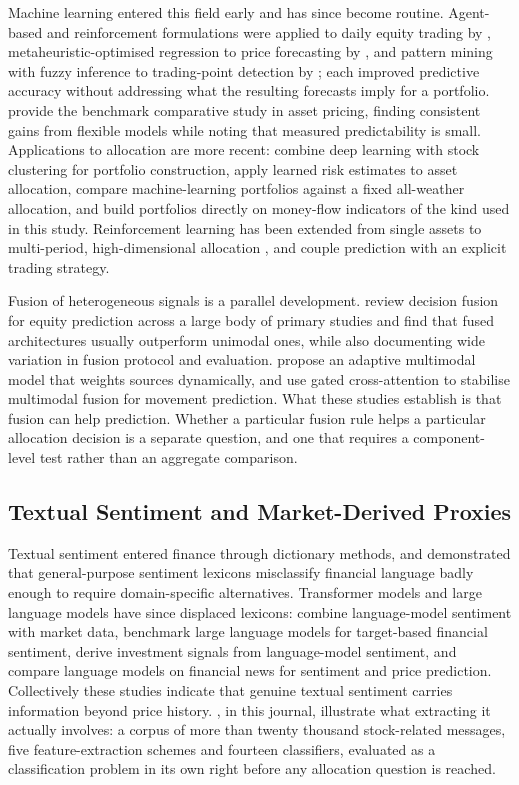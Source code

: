 \documentclass{singlecol-new}
\theoremstyle{TH}{
\newtheorem{lemma}{Lemma}
\newtheorem{theorem}[lemma]{Theorem}
\newtheorem{corrolary}[lemma]{Corrolary}
\newtheorem{conjecture}[lemma]{Conjecture}
\newtheorem{proposition}[lemma]{Proposition}
\newtheorem{claim}[lemma]{Claim}
\newtheorem{stheorem}[lemma]{Wrong Theorem}
\newtheorem{algorithm}{Algorithm}
}
\theoremstyle{THrm}{
\newtheorem{definition}{Definition}[section]
\newtheorem{question}{Question}[section]
\newtheorem{remark}{Remark}
\newtheorem{scheme}{Scheme}
}
\theoremstyle{THhit}{
\newtheorem{case}{Case}[section]
}
\begin{document}
Machine learning entered this field early and has since become routine. Agent-based
and reinforcement formulations were applied to daily equity trading by \citet{lee07},
metaheuristic-optimised regression to price forecasting by \citet{chou18}, and pattern
mining with fuzzy inference to trading-point detection by \citet{huang20}; each
improved predictive accuracy without addressing what the resulting forecasts imply for a
portfolio. \citet{gu20} provide the benchmark comparative study in asset pricing,
finding consistent gains from flexible models while noting that measured predictability
is small. Applications to allocation
are more recent: \citet{ashrafzadeh25} combine deep learning with stock clustering for
portfolio construction, \citet{agal25} apply learned risk estimates to asset
allocation, \citet{ha26} compare machine-learning portfolios against a fixed
all-weather allocation, and \citet{singsiri26} build portfolios directly on money-flow
indicators of the kind used in this study. Reinforcement learning has been extended from single assets to
multi-period, high-dimensional allocation \citep{jiang25, saijai26}, and
\citet{wang26} couple prediction with an explicit trading strategy.

Fusion of heterogeneous signals is a parallel development. \citet{zhang22} review
decision fusion for equity prediction across a large body of primary studies and find
that fused architectures usually outperform unimodal ones, while also documenting wide
variation in fusion protocol and evaluation. \citet{farimani24} propose an adaptive
multimodal model that weights sources dynamically, and \citet{zong25} use gated
cross-attention to stabilise multimodal fusion for movement prediction. What these
studies establish is that fusion can help prediction. Whether a particular fusion rule
helps a particular allocation decision is a separate question, and one that requires a
component-level test rather than an aggregate comparison.

\subsection{Textual Sentiment and Market-Derived Proxies}

Textual sentiment entered finance through dictionary methods, and
\citet{loughran11} demonstrated that general-purpose sentiment lexicons misclassify
financial language badly enough to require domain-specific alternatives. Transformer
models and large language models have since displaced lexicons: \citet{officioso26}
combine language-model sentiment with market data, \citet{muhammad26} benchmark large
language models for target-based financial sentiment, \citet{mun25} derive investment
signals from language-model sentiment, and \citet{chuang25} compare language models on
financial news for sentiment and price prediction. Collectively these studies indicate
that genuine textual sentiment carries information beyond price history.
\citet{george25}, in this journal, illustrate what extracting it actually involves: a
corpus of more than twenty thousand stock-related messages, five feature-extraction
schemes and fourteen classifiers, evaluated as a classification problem in its own
right before any allocation question is reached.
\end{document}
